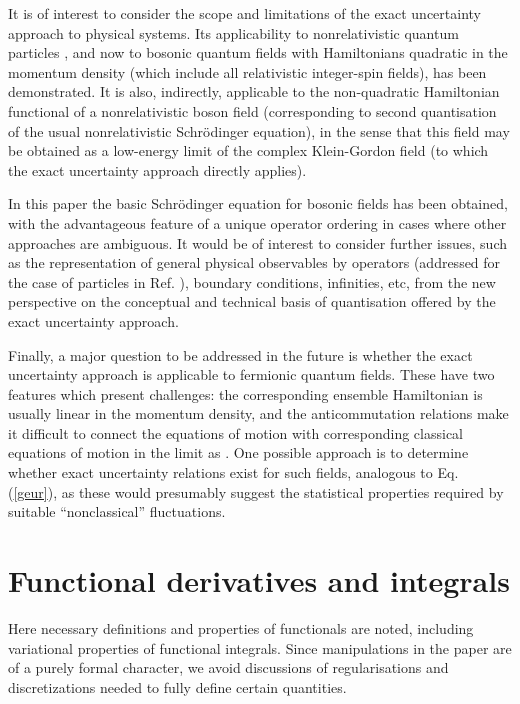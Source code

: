 \documentclass[a4paper,preprint, showpacs, aps, draft]{revtex4}
\begin{document}
{{It is of interest to consider the scope and limitations of the exact
uncertainty approach to physical systems.  Its applicability to
nonrelativistic quantum particles \cite{hallreg, bamberg, note}, and now
to bosonic quantum fields with Hamiltonians quadratic in the momentum
density (which include all relativistic integer-spin fields), 
has been demonstrated. 
It is also, indirectly, applicable
to the non-quadratic Hamiltonian functional
of a nonrelativistic boson field (corresponding to second quantisation
of the
usual nonrelativistic Schr\"{o}dinger equation), in the sense that this
field may be obtained as a low-energy limit of the complex Klein-Gordon
field
\cite{brown} (to which the exact uncertainty approach directly applies).

In this paper the basic Schr\"{o}dinger equation for bosonic fields
has been obtained, with the advantageous feature of a
unique operator ordering in cases where other approaches are ambiguous.   
It would be of interest to consider further issues, such as the
representation of general physical observables by operators 
(addressed for the case of particles in Ref. \cite{hallreg}), boundary
conditions, infinities, etc, from the new perspective on the conceptual
and technical basis of
quantisation offered by the exact uncertainty approach.

Finally, a major question to be addressed in the future is whether the exact
uncertainty approach is applicable to fermionic quantum fields. These have
two features which present challenges: the corresponding
ensemble Hamiltonian is usually linear in the momentum density, and the
anticommutation relations make it difficult to connect the equations of
motion with corresponding classical equations of motion in the limit as
\coordHE{}.  One possible approach is to determine whether
exact uncertainty relations exist for such fields, analogous to Eq.
(\ref{geur}), as these would presumably suggest the statistical
properties required by suitable ``nonclassical'' fluctuations.

\appendix
\section{Functional derivatives and integrals}
Here necessary definitions and properties of functionals are noted,
including variational properties of functional integrals.
Since manipulations in the paper are of a purely formal character,
we avoid discussions of regularisations and discretizations needed to
fully define certain quantities.

}}
\end{document}
